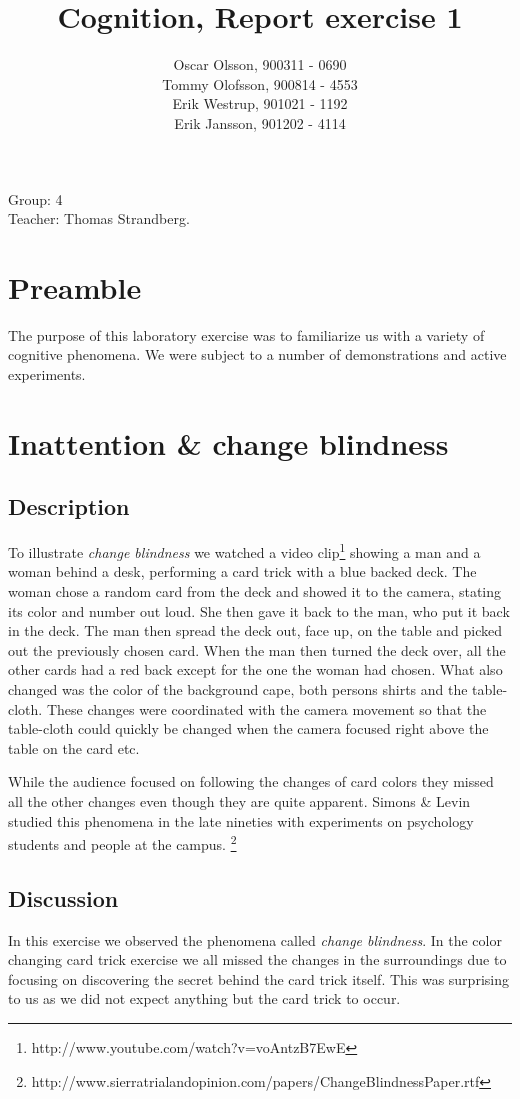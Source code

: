 \documentclass[10pt, a4paper]{article}
\title{Cognition, Report exercise 1}
\date{}
\author{Oscar Olsson, 900311 - 0690\\ Tommy Olofsson, 900814 - 4553\\
	Erik Westrup, 901021 - 1192\\ Erik Jansson, 901202 - 4114}
\begin{document}
\maketitle
\begin{center}
Group: 4 \\
Teacher: Thomas Strandberg.
\end{center}
\newpage

\section{Preamble}
The purpose of this laboratory exercise was to familiarize us with a variety of cognitive phenomena. We were subject to a number of demonstrations and active experiments.

\section{Inattention \& change blindness}
\subsection{Description}
To illustrate \emph{change blindness} we watched a video clip\footnote{http://www.youtube.com/watch?v=voAntzB7EwE} showing a man and a woman behind a desk, performing a card trick with a blue backed deck. The woman chose a random card from the deck and showed it to the camera, stating its color and number out loud. She then gave it back to the man, who put it back in the deck. The man then spread the deck out, face up, on the table and picked out the previously chosen card. When the man then turned the deck over, all the other cards had a red back except for the one the woman had chosen. What also changed was the color of the background cape, both persons shirts and the table-cloth. These changes were coordinated with the camera movement so that the table-cloth could quickly be changed when the camera focused right above the table on the card etc.

While the audience focused on following the changes of card colors they missed all the other changes even though they are quite apparent. Simons \& Levin studied this phenomena in the late nineties with experiments on psychology students and people at the campus. \footnote{http://www.sierratrialandopinion.com/papers/ChangeBlindnessPaper.rtf}

\subsection{Discussion}
In this exercise we observed the phenomena called \emph{change blindness}. In the color changing card trick exercise we all missed the changes in the surroundings due to focusing on discovering the secret behind the card trick itself. This was surprising to us as we did not expect anything but the card trick to occur. 
\end{document}
